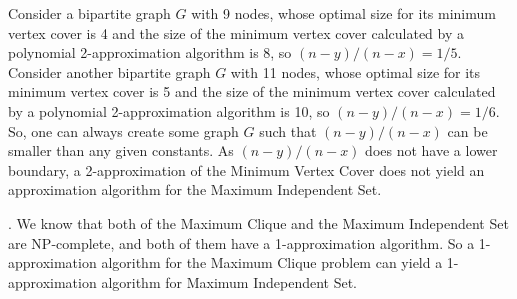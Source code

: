 \documentclass[11pt]{article} %
\begin{document}
Consider a bipartite graph $G$ with 9 nodes, whose optimal size for its minimum vertex cover is 4 and the size of the minimum vertex cover calculated by a polynomial 2-approximation algorithm is 8, so $(n-y)/(n-x) = 1/5$. Consider another bipartite graph $G$ with 11 nodes, whose optimal size for its minimum vertex cover is 5 and the size of the minimum vertex cover calculated by a polynomial 2-approximation algorithm is 10, so $(n-y)/(n-x) = 1/6$. So, one can always create some graph $G$ such that $(n-y)/(n-x)$ can be smaller than any given constants.
As $(n-y)/(n-x)$ does not have a lower boundary, a 2-approximation of the Minimum Vertex Cover does not yield an approximation algorithm for the Maximum Independent Set.



. We know that both of the Maximum Clique and the Maximum Independent Set are NP-complete, and both of them have a 1-approximation algorithm. So a 1-approximation algorithm for the Maximum Clique problem can yield a 1-approximation algorithm for Maximum Independent Set. 
\end{document}
